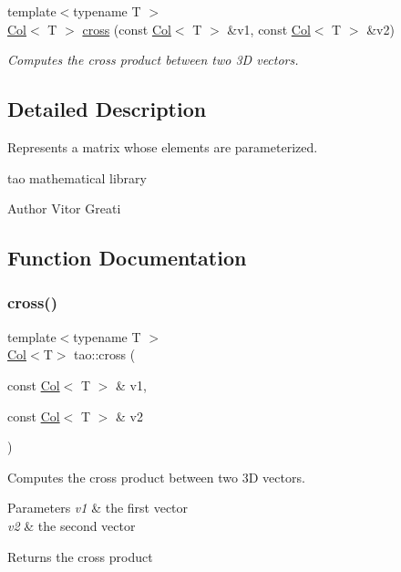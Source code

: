 \begin{DoxyCompactItemize}
\item 
{\footnotesize template$<$typename T $>$ }\\\mbox{\hyperlink{classtao_1_1_col}{Col}}$<$ T $>$ \mbox{\hyperlink{namespacetao_af5000f65212f6e916c069800238592a6}{cross}} (const \mbox{\hyperlink{classtao_1_1_col}{Col}}$<$ T $>$ \&v1, const \mbox{\hyperlink{classtao_1_1_col}{Col}}$<$ T $>$ \&v2)
\begin{DoxyCompactList}\small\item\em Computes the cross product between two 3D vectors. \end{DoxyCompactList}\end{DoxyCompactItemize}


\subsection{Detailed Description}
Represents a matrix whose elements are parameterized. 

tao mathematical library

\begin{DoxyAuthor}{Author}
Vitor Greati 
\end{DoxyAuthor}


\subsection{Function Documentation}
\mbox{\label{namespacetao_af5000f65212f6e916c069800238592a6}} 
\subsubsection{\texorpdfstring{cross()}{cross()}}
{\footnotesize\ttfamily template$<$typename T $>$ \\
\mbox{\hyperlink{classtao_1_1_col}{Col}}$<$T$>$ tao\+::cross (\begin{DoxyParamCaption}\item[{const \mbox{\hyperlink{classtao_1_1_col}{Col}}$<$ T $>$ \&}]{v1,  }\item[{const \mbox{\hyperlink{classtao_1_1_col}{Col}}$<$ T $>$ \&}]{v2 }\end{DoxyParamCaption})}



Computes the cross product between two 3D vectors. 


\begin{DoxyParams}{Parameters}
{\em v1} & the first vector \\
\hline
{\em v2} & the second vector \\
\hline
\end{DoxyParams}
\begin{DoxyReturn}{Returns}
the cross product 
\end{DoxyReturn}
